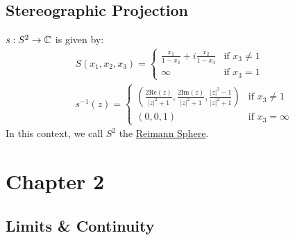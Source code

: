 \documentclass[10pt]{paper}
\newcommand{\cpr}[1]{\left(#1\right)}
\renewcommand{\Re}[1]{\text{Re}\left(#1\right)}
\renewcommand{\Im}[1]{\text{Im}\left(#1\right)}
\newcommand{\ul}[1]{\underline{#1}}
\begin{document}
\subsection{Stereographic Projection}
$s:S^2\to\mathbb{C}$ is given by:
\begin{align*}
  &S(x_1,x_2,x_3)=\begin{cases}
    \frac{x_1}{1-x_3}+i\frac{x_2}{1-x_3}&\text{if }x_3\ne 1\\
    \infty &\text{if }x_3 = 1
  \end{cases}\\
  &s^{-1}(z)=\begin{cases}
    \cpr{\frac{2\Re{z}}{|z|^2+1}, \frac{2\Im{z}}{|z|^2+1}, \frac{|z|^2-1}{|z|^2+1}}&\text{if }x_3\ne 1\\
    (0,0,1)&\text{if }x_3 = \infty
  \end{cases}
\end{align*}
In this context, we call $S^2$ the \ul{Reimann Sphere}.
\section{Chapter 2}
\subsection{Limits \& Continuity}
\end{document}
